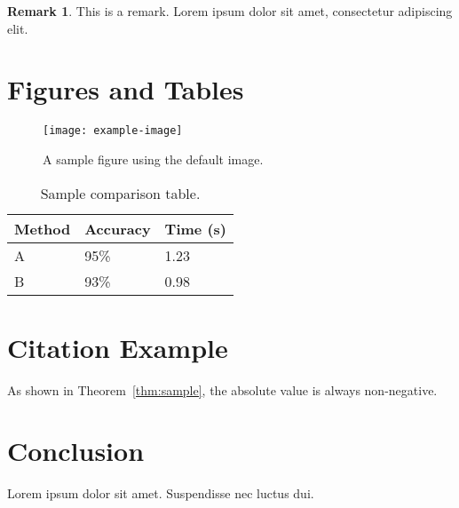 \documentclass[11pt]{article}
\theoremstyle{definition}
\theoremstyle{italicremark}
\newtheorem{remark}[theorem]{Remark}
\begin{document}
\begin{remark}
This is a remark. Lorem ipsum dolor sit amet, consectetur adipiscing elit.
\end{remark}

\section{Figures and Tables}

\begin{figure}[H]
  \centering
  \texttt{[image: example-image]}
  \caption{A sample figure using the default image.}
  \label{fig:sample}
\end{figure}


\begin{table}[H]
\centering
\begin{tabular}{@{}lll@{}}
\toprule
Method & Accuracy & Time (s) \\
\midrule
A & 95\% & 1.23 \\
B & 93\% & 0.98 \\
\bottomrule
\end{tabular}
\caption{Sample comparison table.}
\label{tab:comparison}
\end{table}

\section{Citation Example}

As shown in Theorem~\ref{thm:sample}, the absolute value is always non-negative.

\section{Conclusion}
Lorem ipsum dolor sit amet. Suspendisse nec luctus dui. 



\end{document}
